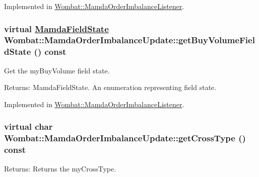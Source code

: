 Implemented in \hyperlink{classWombat_1_1MamdaOrderImbalanceListener_7f5cb04154fe3ec2673e616a5958b9f2}{Wombat::Mamda\-Order\-Imbalance\-Listener}.\hypertarget{classWombat_1_1MamdaOrderImbalanceUpdate_54acb8ab3f7eea4c35f2b6d411cc839f}{
\subsubsection[getBuyVolumeFieldState]{\setlength{\rightskip}{0pt plus 5cm}virtual \hyperlink{namespaceWombat_93aac974f2ab713554fd12a1fa3b7d2a}{Mamda\-Field\-State} Wombat::Mamda\-Order\-Imbalance\-Update::get\-Buy\-Volume\-Field\-State () const}}
\label{classWombat_1_1MamdaOrderImbalanceUpdate_54acb8ab3f7eea4c35f2b6d411cc839f}


Get the my\-Buy\-Volume field state. 

\begin{Desc}
\item[Returns:]Mamda\-Field\-State. An enumeration representing field state. \end{Desc}


Implemented in \hyperlink{classWombat_1_1MamdaOrderImbalanceListener_979197d028cd40ebe9d689c52377f02c}{Wombat::Mamda\-Order\-Imbalance\-Listener}.\hypertarget{classWombat_1_1MamdaOrderImbalanceUpdate_3c8f3b9f44661b8ca22f58fe039aa284}{
\subsubsection[getCrossType]{\setlength{\rightskip}{0pt plus 5cm}virtual char Wombat::Mamda\-Order\-Imbalance\-Update::get\-Cross\-Type () const}}
\label{classWombat_1_1MamdaOrderImbalanceUpdate_3c8f3b9f44661b8ca22f58fe039aa284}


\begin{Desc}
\item[Returns:]Returns the my\-Cross\-Type. \end{Desc}


